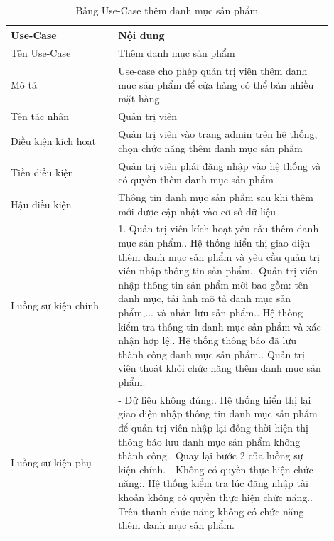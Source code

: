 \begin{longtable}[htp]{ |m{0.3\linewidth}|m{0.6\linewidth}|}
 \caption{Bảng Use-Case thêm danh mục sản phẩm \label{long}}\\
 \hline
 Use-Case & Nội dung \\
 \hline
 Tên Use-Case & Thêm danh mục sản phẩm \\
 \hline
 Mô tả & Use-case cho phép quản trị viên thêm danh mục sản phẩm để cửa hàng có thể bán nhiều mặt hàng\\
 \hline
 Tên tác nhân & Quản trị viên\\
 \hline
 Điều kiện kích hoạt & Quản trị viên vào trang admin trên hệ thống, chọn chức năng thêm danh mục sản phẩm\\
 \hline
 Tiền điều kiện & Quản trị viên phải đăng nhập vào hệ thống và có quyền thêm danh mục sản phẩm\\
 \hline
 Hậu điều kiện & Thông tin danh mục sản phẩm sau khi thêm mới được cập nhật vào cơ sở dữ liệu\\
 \hline
 Luồng sự kiện chính & 
 1. Quản trị viên kích hoạt yêu cầu thêm danh mục sản phẩm.\newline
 2. Hệ thống hiển thị giao diện thêm danh mục sản phẩm và yêu cầu quản trị viên nhập thông tin sản phẩm.\newline
 3. Quản trị viên nhập thông tin sản phẩm mới bao gồm: tên danh mục, tải ảnh mô tả danh mục sản phẩm,... và nhấn lưu sản phẩm.\newline
 4. Hệ thống kiểm tra thông tin danh mục sản phẩm và xác nhận hợp lệ.\newline
 5. Hệ thống thông báo đã lưu thành công danh mục sản phẩm.\newline	
 6. Quản trị viên thoát khỏi chức năng thêm danh mục sản phẩm.
 \\
 \hline
 Luồng sự kiện phụ & 
 - Dữ liệu không đúng:\newline
  1. Hệ thống hiển thị lại giao diện nhập thông tin danh mục sản phẩm để quản trị viên nhập lại đồng thời hiện thị thông báo lưu danh mục sản phẩm không thành công.\newline
  2. Quay lại bước 2 của luồng sự kiện chính.\newline
  - Không có quyền thực hiện chức năng:\newline
  1. Hệ thống kiểm tra lúc đăng nhập tài khoản không có quyền thực hiện chức năng.\newline
  2. Trên thanh chức năng không có chức năng thêm danh mục sản phẩm.
 \\
 \hline
\end{longtable}

